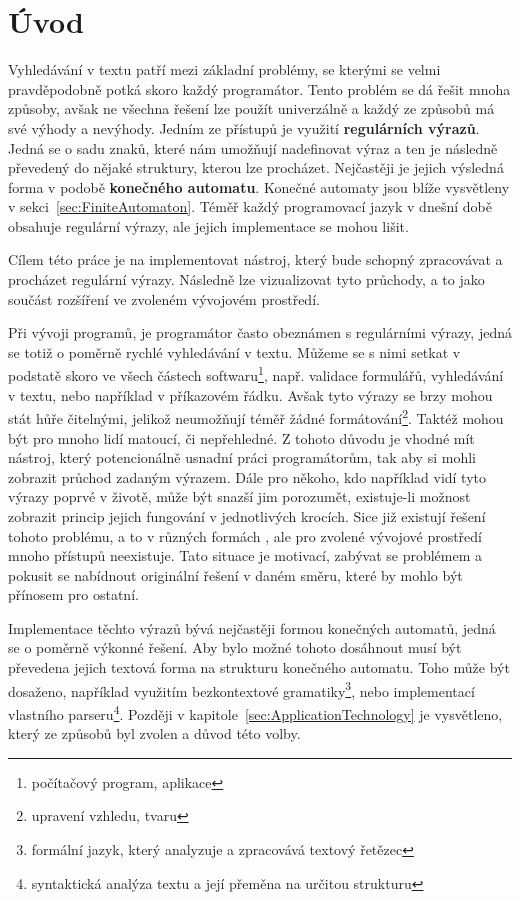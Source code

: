 \chapter{Úvod}\label{sec:Introduction}

Vyhledávání v textu patří mezi základní problémy, se kterými se velmi pravděpodobně potká skoro každý programátor. 
Tento problém se dá řešit mnoha způsoby, avšak ne všechna řešení lze použít univerzálně a každý ze způsobů má své výhody a nevýhody.
Jedním ze přístupů je využití \textbf{regulárních výrazů}. 
Jedná se o sadu znaků, které nám umožňují nadefinovat výraz a ten je následně převedený do nějaké struktury, kterou lze procházet. 
Nejčastěji je jejich výsledná forma v podobě \textbf{konečného automatu}. 
Konečné automaty jsou blíže vysvětleny v sekci~\ref{sec:FiniteAutomaton}.
Téměř každý programovací jazyk v dnešní době obsahuje regulární výrazy, ale jejich implementace se mohou lišit.

Cílem této práce je na implementovat nástroj, který bude schopný zpracovávat a procházet regulární výrazy. 
Následně lze vizualizovat tyto průchody, a to jako součást rozšíření ve zvoleném vývojovém prostředí.

Při vývoji programů, je programátor často obeznámen s regulárními výrazy, jedná se totiž o poměrně rychlé vyhledávání v textu. 
Můžeme se s nimi setkat v podstatě skoro ve všech částech softwaru\footnote{počítačový program, aplikace}, např. validace formulářů, vyhledávání v textu, nebo například v příkazovém řádku.
Avšak tyto výrazy se brzy mohou stát hůře čitelnými, jelikož neumožňují téměř žádné formátování\footnote{upravení vzhledu, tvaru}. 
Taktéž mohou být pro mnoho lidí matoucí, či nepřehledné.
Z tohoto důvodu je vhodné mít nástroj, který potencionálně usnadní práci programátorům, tak aby si mohli zobrazit průchod zadaným výrazem.
Dále pro někoho, kdo například vidí tyto výrazy poprvé v životě, může být snazší jim porozumět, existuje-li možnost zobrazit princip jejich fungování v jednotlivých krocích.
Sice již existují řešení tohoto problému, a to v různých formách \cite{Dib, Regexper, RegExr}, ale pro zvolené vývojové prostředí mnoho přístupů neexistuje.
Tato situace je motivací, zabývat se problémem a pokusit se nabídnout originální řešení v daném směru, které by mohlo být přínosem pro ostatní.

Implementace těchto výrazů bývá nejčastěji formou konečných automatů, jedná se o poměrně výkonné řešení. 
Aby bylo možné tohoto dosáhnout musí být převedena jejich textová forma na strukturu konečného automatu.
Toho může být dosaženo, například využitím bezkontextové gramatiky\footnote{formální jazyk, který analyzuje a zpracovává textový řetězec}, nebo implementací vlastního parseru\footnote{syntaktická analýza textu a její přeměna na určitou strukturu}.
Později v kapitole~\ref{sec:ApplicationTechnology} je vysvětleno, který ze způsobů byl zvolen a důvod této volby.

